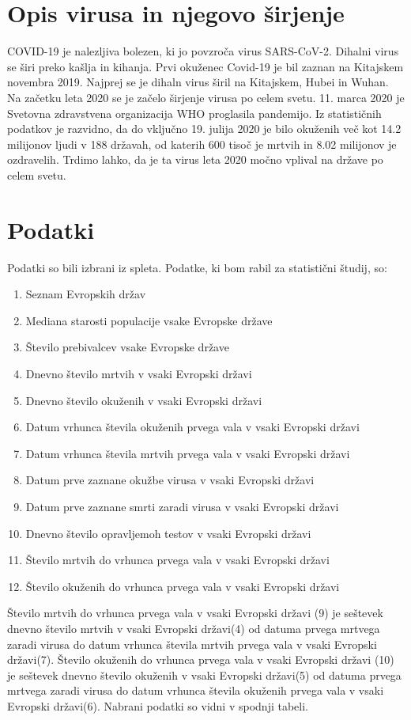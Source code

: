 \documentclass[a4paper,11pt]{article}
\begin{document}
\section{Opis virusa in njegovo širjenje}
COVID-19 je nalezljiva bolezen, ki jo povzroča virus SARS-CoV-2. Dihalni virus se širi preko kašlja in kihanja. Prvi okuženec Covid-19 je bil zaznan na Kitajskem novembra 2019. Najprej se je dihaln virus širil na Kitajskem, Hubei in Wuhan. Na začetku leta 2020 se je začelo širjenje virusa po celem svetu. 11. marca 2020 je Svetovna zdravstvena organizacija WHO proglasila pandemijo. Iz statističnih podatkov je razvidno, da do vključno 19. julija 2020 je bilo okuženih več kot 14.2 milijonov ljudi v 188 državah, od katerih 600 tisoč je mrtvih in 8.02 milijonov je ozdravelih. Trdimo lahko, da je ta virus leta 2020 močno vplival na države po celem svetu.
\section{Podatki}
Podatki so bili izbrani iz spleta. Podatke, ki bom rabil za statistični študij, so:
\begin{enumerate}
\item{Seznam Evropskih držav}
\item{Mediana starosti populacije vsake Evropske države}
\item{Število prebivalcev vsake Evropske države}
\item{Dnevno število mrtvih v vsaki Evropski državi}
\item{Dnevno število okuženih v vsaki Evropski državi}
\item{Datum vrhunca števila okuženih prvega vala v vsaki Evropski državi}
\item{Datum vrhunca števila mrtvih prvega vala v vsaki Evropski državi}
\item{Datum prve zaznane okužbe virusa v vsaki Evropski državi}
\item{Datum prve zaznane smrti zaradi virusa v vsaki Evropski državi}
\item{Dnevno število opravljemoh testov v vsaki Evropski državi}
\item{Število mrtvih do vrhunca prvega vala v vsaki Evropski državi}
\item{Število okuženih do vrhunca prvega vala v vsaki Evropski državi}
\end{enumerate}

Število mrtvih do vrhunca prvega vala v vsaki Evropski državi (9) je seštevek dnevno število mrtvih v vsaki Evropski državi(4) od datuma prvega mrtvega zaradi virusa do datum vrhunca števila mrtvih prvega vala v vsaki Evropski državi(7).
Število okuženih do vrhunca prvega vala v vsaki Evropski državi (10) je seštevek dnevno število okuženih v vsaki Evropski državi(5) od datuma prvega mrtvega zaradi virusa do datum vrhunca števila okuženih prvega vala v vsaki Evropski državi(6). Nabrani podatki so vidni v spodnji tabeli.\\
\end{document}
